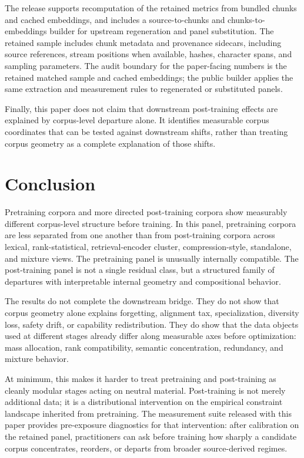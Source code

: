 \documentclass[11pt]{article}
\begin{document}
The release supports recomputation of the retained metrics from bundled chunks and cached embeddings, and includes a source-to-chunks and chunks-to-embeddings builder for upstream regeneration and panel substitution. The retained sample includes chunk metadata and provenance sidecars, including source references, stream positions when available, hashes, character spans, and sampling parameters. The audit boundary for the paper-facing numbers is the retained matched sample and cached embeddings; the public builder applies the same extraction and measurement rules to regenerated or substituted panels.

Finally, this paper does not claim that downstream post-training effects are explained by corpus-level departure alone. It identifies measurable corpus coordinates that can be tested against downstream shifts, rather than treating corpus geometry as a complete explanation of those shifts.

\section{Conclusion}\label{conclusion}

Pretraining corpora and more directed post-training corpora show measurably different corpus-level structure before training. In this panel, pretraining corpora are less separated from one another than from post-training corpora across lexical, rank-statistical, retrieval-encoder cluster, compression-style, standalone, and mixture views. The pretraining panel is unusually internally compatible. The post-training panel is not a single residual class, but a structured family of departures with interpretable internal geometry and compositional behavior.

The results do not complete the downstream bridge. They do not show that corpus geometry alone explains forgetting, alignment tax, specialization, diversity loss, safety drift, or capability redistribution. They do show that the data objects used at different stages already differ along measurable axes before optimization: mass allocation, rank compatibility, semantic concentration, redundancy, and mixture behavior.

At minimum, this makes it harder to treat pretraining and post-training as cleanly modular stages acting on neutral material. Post-training is not merely additional data; it is a distributional intervention on the empirical constraint landscape inherited from pretraining. The measurement suite released with this paper provides pre-exposure diagnostics for that intervention: after calibration on the retained panel, practitioners can ask before training how sharply a candidate corpus concentrates, reorders, or departs from broader source-derived regimes.
\end{document}
